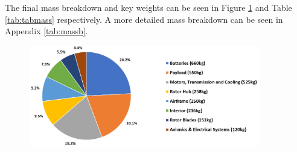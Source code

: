 \documentclass[11pt,a4paper]{article}
\begin{document}
The final mass breakdown and key weights can be seen in Figure \ref{fig:pie} and Table \ref{tab:tabmass} respectively. A more detailed mass breakdown can be seen in Appendix \ref{tab:massb}.
\begin{figure}[H]
\centering
		\includegraphics[width=0.9\textwidth]{PIE2.PNG}
		\label{fig:pie}
\end{figure}{}
\end{document}
